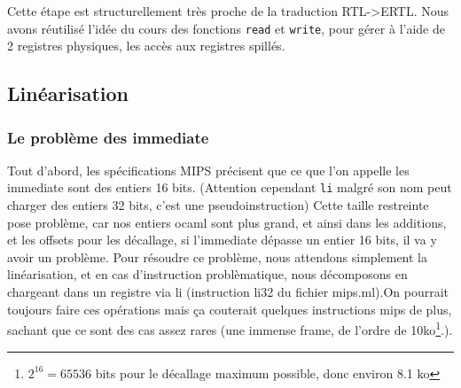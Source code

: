\documentclass[a4paper]{article}
\begin{document}
Cette étape est structurellement très proche de la traduction RTL->ERTL.
Nous avons réutilisé l'idée du cours des fonctions \texttt{read} et
\texttt{write}, pour gérer à l'aide de 2 registres physiques,
les accès aux registres spillés. 

\subsection{Linéarisation}

\subsubsection{Le problème des immediate}
Tout d'abord, les spécifications MIPS précisent que ce que l'on appelle
les
 immediate sont des entiers 16 bits. (Attention cependant \texttt{li} malgré son
nom peut charger des entiers 32 bits, c'est une pseudoinstruction) Cette
taille restreinte pose problème, car nos entiers ocaml sont plus grand,
et ainsi dans les additions, et les offsets pour les décallage, si
l'immediate dépasse un entier 16 bits, il va y avoir un problème. Pour
résoudre ce problème, nous attendons simplement la linéarisation, et en
cas d'instruction problèmatique, nous décomposons en chargeant dans un
registre via li (instruction li32 du fichier mips.ml).On pourrait toujours
faire ces opérations mais ça couterait quelques instructions mips de plus,
sachant que ce sont des cas assez rares (une immense frame, de l'ordre de
10ko\footnote{$2^16=65536$ bits pour le décallage maximum possible, donc environ 8.1 ko}.).
\end{document}

